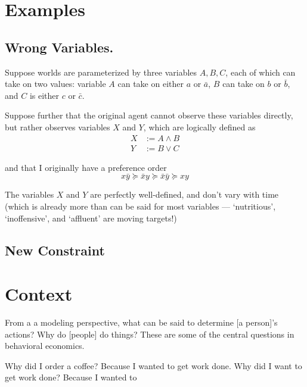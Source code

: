 \documentclass{book}
\begin{document}
	\chapter{Examples}
	
	\section{Wrong Variables.}
	Suppose worlds are parameterized by three variables $A, B, C$, each of which can take on two values: variable $A$ can take on either $a$ or $\bar a$, $B$ can take on $b$ or $\bar b$, and $C$ is either $c$ or $\bar c$.
	
	Suppose further that the original agent cannot observe these variables directly, but rather observes variables $X$ and $Y$, which are logically defined as 
	\begin{align*}
		X &:= A \land B \\
		Y &:= B \lor C
	\end{align*}
	
	and that I originally have a preference order
	\[ x \bar y \succcurlyeq \bar x y \succcurlyeq \bar x \bar y \succcurlyeq x y  \]
	
	The variables $X$ and $Y$ are perfectly well-defined, and don't vary with time (which is already more than can be said for most variables --- `nutritious', `inoffensive', and `affluent' are moving targets!)
	
	\section{New Constraint}
	
	
	
	

	\chapter{Context}
	From a a modeling perspective, what can be said to determine [a person]'s actions? Why do [people] do things? These are some of the central questions in behavioral economics. 
	
	
	Why did I order a coffee? Because I wanted to get work done.
	Why did I want to get work done? Because I wanted to 
	
\end{document}
